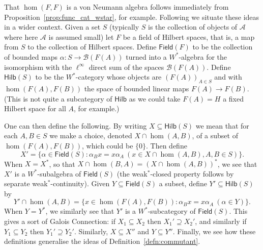 \documentclass[a4paper,11pt]{article}
\theoremstyle{plain}
\theoremstyle{remark}
\newcommand{\mc}[1]{\mathcal{#1}}
\newcommand{\catHilb}{\textsf{Hilb}}
\newcommand{\field}{\textsf{Field}}
\newcommand{\catHilbField}[1]{\textsf{Hilb}(#1)}
\begin{document}
That $\hom(F,F)$ is a von Neumann algebra follows immediately from Proposition~\ref{prop:func_cat_wstar}, for example.  Following \cite[Section~4]{GLR_Wstar_categories} we situate these ideas in a wider context.  Given a set $S$ (typically $S$ is the collection of objects of $\mc A$ where here $\mc A$ is assumed small) let $F$ be a field of Hilbert spaces, that is, a map from $S$ to the collection of Hilbert spaces.  Define $\field(F)$ to be the collection of bounded maps $\alpha \colon S \to \mc B(F(A))$ turned into a $W^*$-algebra for the isomorphism with the $\ell^\infty$ direct sum of the spaces $\mc B(F(A))$.  Define $\catHilbField{S}$ to be the $W^*$-category whose objects are $(F(A))_{A\in S}$ and with $\hom(F(A), F(B))$ the space of bounded linear maps $F(A) \to F(B)$.  (This is not quite a subcategory of $\catHilb$ as we could take $F(A) = H$ a fixed Hilbert space for all $A$, for example.)  

One can then define the following.  By writing $X \subseteq\catHilbField{S}$ we mean that for each $A,B\in S$ we make a choice, denoted $X\cap\hom(A,B)$, of a subset of $\hom(F(A), F(B))$, which could be $\{0\}$.  Then define
\[ X' = \{ \alpha \in \field(S) : \alpha_B x = x\alpha_A \ (x\in X\cap\hom(A,B), A,B\in S) \}. \]
When $X=X^*$, so that $X \cap \hom(B,A) = (X\cap\hom(A,B))^*$, we see that $X'$ is a $W^*$-subalgebra of $\field(S)$ (the weak$^*$-closed property follows by separate weak$^*$-continuity).
Given $Y \subseteq \field(S)$ a subset, define $Y' \subseteq \catHilbField{S}$ by
\[ Y'\cap\hom(A,B) = \{ x \in \hom(F(A), F(B)) : \alpha_B x = x\alpha_A \ (\alpha\in Y) \}. \]
When $Y=Y^*$, we similarly see that $Y'$ is a $W^*$-subcategory of $\field(S)$.  This gives a sort of Galois Connection: if $X_1 \subseteq X_2$ then $X_1' \supseteq X_2'$, and similarly if $Y_1 \subseteq Y_2$ then $Y_1' \supseteq Y_2'$.  Similarly, $X \subseteq X''$ and $Y \subseteq Y''$.  Finally, we see how these definitions generalise the ideas of Definition~\ref{defn:commutant}.
\end{document}
